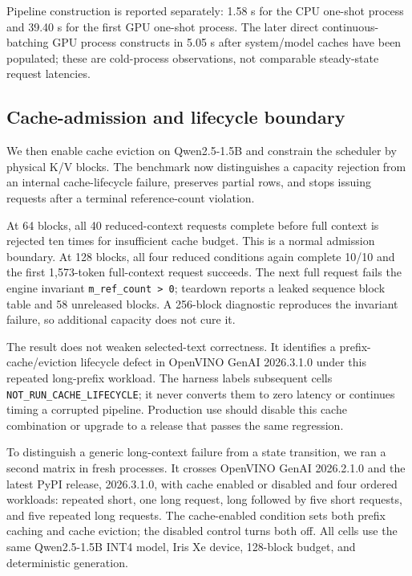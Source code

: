 \documentclass[10pt]{article}
\begin{document}
Pipeline construction is reported separately: 1.58 s for the CPU one-shot
process and 39.40 s for the first GPU one-shot process. The later direct
continuous-batching GPU process constructs in 5.05 s after system/model caches
have been populated; these are cold-process observations, not comparable
steady-state request latencies.

\subsection{Cache-admission and lifecycle boundary}

We then enable cache eviction on Qwen2.5-1.5B and constrain the scheduler by
physical K/V blocks. The benchmark now distinguishes a capacity rejection from
an internal cache-lifecycle failure, preserves partial rows, and stops issuing
requests after a terminal reference-count violation.

\begin{table}[H]
\centering
\scriptsize
\caption{OpenVINO GenAI cache boundary. Selected is visible selected text, not
native E2. Full $n$ reports measured requests out of ten; tail metrics exclude
all rejected or post-corruption cells.}
\resizebox{\linewidth}{!}{%
}
\label{tab:openvino-cache-boundary}
\end{table}

At 64 blocks, all 40 reduced-context requests complete before full context is
rejected ten times for insufficient cache budget. This is a normal admission
boundary. At 128 blocks, all four reduced conditions again complete 10/10 and
the first 1,573-token full-context request succeeds. The next full request
fails the engine invariant \texttt{m\_ref\_count > 0}; teardown reports a
leaked sequence block table and 58 unreleased blocks. A 256-block diagnostic
reproduces the invariant failure, so additional capacity does not cure it.

The result does not weaken selected-text correctness. It identifies a
prefix-cache/eviction lifecycle defect in OpenVINO GenAI 2026.3.1.0 under this
repeated long-prefix workload. The harness labels subsequent cells
\texttt{NOT\_RUN\_CACHE\_LIFECYCLE}; it never converts them to zero latency or
continues timing a corrupted pipeline. Production use should disable this
cache combination or upgrade to a release that passes the same regression.

To distinguish a generic long-context failure from a state transition, we ran
a second matrix in fresh processes. It crosses OpenVINO GenAI 2026.2.1.0 and
the latest PyPI release, 2026.3.1.0, with cache enabled or disabled and four
ordered workloads: repeated short, one long request, long followed by five
short requests, and five repeated long requests. The cache-enabled condition
sets both prefix caching and cache eviction; the disabled control turns both
off. All cells use the same Qwen2.5-1.5B INT4 model, Iris Xe device, 128-block
budget, and deterministic generation.
\end{document}
